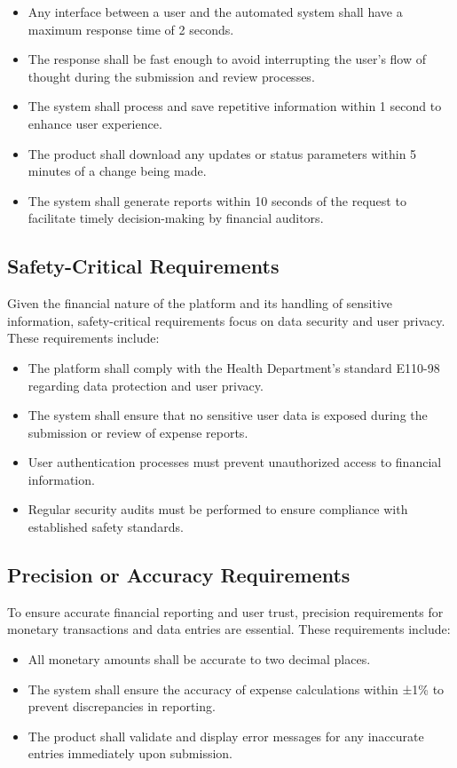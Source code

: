 \documentclass[12pt]{article}
\begin{document}
\begin{itemize}
    \item Any interface between a user and the automated system shall have a maximum response time of 2 seconds.
    \item The response shall be fast enough to avoid interrupting the user’s flow of thought during the submission and review processes.
    \item The system shall process and save repetitive information within 1 second to enhance user experience.
    \item The product shall download any updates or status parameters within 5 minutes of a change being made.
    \item The system shall generate reports within 10 seconds of the request to facilitate timely decision-making by financial auditors.
\end{itemize}

\subsection{Safety-Critical Requirements}
Given the financial nature of the platform and its handling of sensitive information, safety-critical requirements focus on data security and user privacy. These requirements include:

\begin{itemize}
    \item The platform shall comply with the Health Department’s standard E110-98 regarding data protection and user privacy.
    \item The system shall ensure that no sensitive user data is exposed during the submission or review of expense reports.
    \item User authentication processes must prevent unauthorized access to financial information.
    \item Regular security audits must be performed to ensure compliance with established safety standards.
\end{itemize}

\subsection{Precision or Accuracy Requirements}
To ensure accurate financial reporting and user trust, precision requirements for monetary transactions and data entries are essential. These requirements include:

\begin{itemize}
    \item All monetary amounts shall be accurate to two decimal places.
    \item The system shall ensure the accuracy of expense calculations within ±1\% to prevent discrepancies in reporting.
    \item The product shall validate and display error messages for any inaccurate entries immediately upon submission.
\end{itemize}
\end{document}
